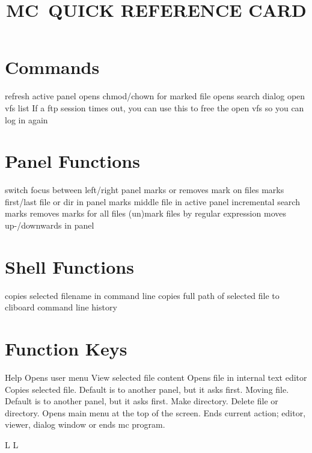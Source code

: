 
\def\content{MC}
\def\versionnumber{0.1}  %
\def\version{v\versionnumber\ \month\ \year}




\title{\uppercase{\content\ quick reference card}}

\shortintro

\vskip 0.5cm

\section{Commands}{}
	{refresh active panel}
	{opens chmod/chown for marked file}
	{opens search dialog}
	{open vfs list}
\cmdExmpl{}	{If a ftp session times out, you can use this to free the open vfs so you can log in again}


\section{Panel Functions}{}
\cmdS{\tab}	{switch focus between left/right panel}
	{marks or removes mark on files}
	{marks first/last file or dir in panel}
	{marks middle file in active panel}
	{incremental search}
\cmdS{$\ast$}	{marks \or removes marks for all files}
\cmdS{+~\bs}	{(un)mark files by regular expression}
	{moves up-/downwards in panel}


\section{Shell Functions}{}

\cmdS{\alt \enter}	{copies selected filename in command line}
\cmdS{\ctrl \shift \enter}	{copies full path of selected file to cliboard}
	{command line history}


\section{Function Keys}{}
	{Help}
	{Opens user menu}
	{View selected file content}
	{Opens file in internal text editor}
	{Copies selected file. Default is to another panel, but it asks first.}
	{Moving file. Default is to another panel, but it asks first.}
	{Make directory.}
	{Delete file or directory.}
	{Opens main menu at the top of the screen.}
	{Ends current action; editor, viewer, dialog window or ends mc program.}


\copyrightnotice

\vfil
\supereject
\if L\lr \else\null\vfill\eject\fi
\if L\lr \else\null\vfill\eject\fi
\bye


